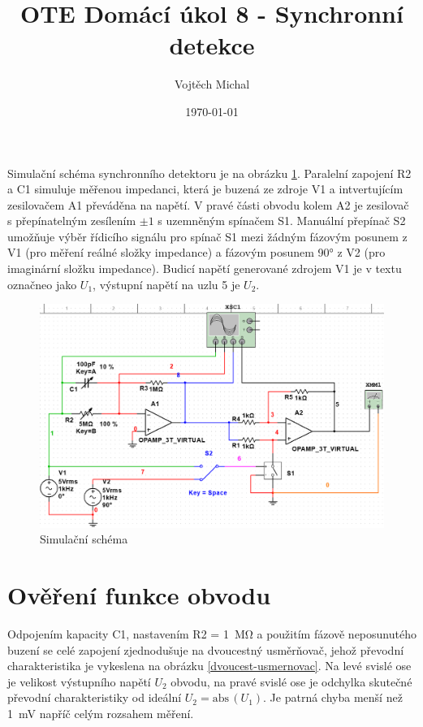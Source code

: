 \documentclass[twoside]{article}
\title{OTE Domácí úkol 8 - Synchronní detekce}
\author{Vojtěch Michal}
\date{\today}
\begin{document}
\maketitle

Simulační schéma synchronního detektoru je na obrázku \ref{schema}.
Paralelní zapojení R2 a C1 simuluje měřenou impedanci,
která je buzená ze zdroje V1 a intvertujícím zesilovačem A1
převáděna na napětí. V pravé části obvodu kolem A2 je zesilovač s přepínatelným
zesílením  $\pm 1$ s uzemněným spínačem S1. Manuální přepínač S2
umožňuje výběr řídicího signálu pro spínač S1 mezi žádným fázovým posunem z V1
(pro měření reálné složky impedance) a fázovým posunem 90° z V2 (pro imaginární složku impedance).
Budicí napětí generované zdrojem V1 je v textu označneo jako $U_1$, výstupní napětí na uzlu 5
je $U_2$.

\begin{figure}[h]
    \centering
    \includegraphics[width=\textwidth]{schema.png}
    \caption{Simulační schéma}
    \label{schema}
\end{figure}
\clearpage

\section{Ověření funkce obvodu}

Odpojením kapacity C1, nastavením R2 = \SI{1}{\mega\ohm} 
a použitím fázově neposunutého buzení
se celé zapojení zjednodušuje na dvoucestný usměrňovač, jehož převodní charakteristika
je vykeslena na obrázku \ref{dvoucest-usmernovac}. Na levé
svislé ose je velikost výstupního napětí $U_2$ obvodu,
na pravé svislé ose je odchylka skutečné převodní charakteristiky od
ideální $U_2 = \text{abs}\,(U_1)$. Je patrná chyba menší než \SI{1}{\milli\volt}
napříč celým rozsahem měření.
\end{document}
